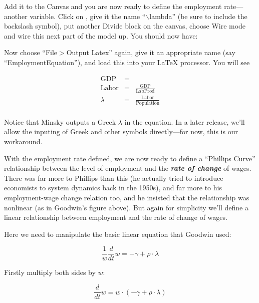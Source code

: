 \begin{center}
\end{center}

Add it to the Canvas and you are now ready to define the employment
rate---another variable. Click on , give it
the name ``$\backslash$lambda'' (be sure to include the backslash symbol), put
another Divide block on the canvas, choose Wire mode and wire this
next part of the model up. You should now have:



Now choose ``File$>$Output Latex'' again, give it an appropriate name (say ``EmploymentEquation''), and load this into your LaTeX processor. You will see

\begin{eqnarray*}
\mathrm{GDP}&=&\\
\mathrm{Labor}&=&\frac{\mathrm{GDP}}{\mathrm{LabProd}}\\
\lambda&=&\frac{\mathrm{Labor}}{\mathrm{Population}}\\
\end{eqnarray*}

Notice that Minsky outputs a Greek $\lambda$ in the equation. In a
later release, we'll allow the inputing of Greek and other symbols
directly---for now, this is our workaround. 


With the employment rate defined, we are now ready to define a
``Phillips Curve'' relationship between the level of employment and the
{\em\bf rate of change} of wages. There was far more to Phillips than this (he
actually tried to introduce economists to system dynamics back in the
1950s), and far more to his employment-wage change relation too, and
he insisted that the relationship was nonlinear (as in Goodwin's
figure above). But again for simplicity we'll define a linear
relationship between employment and the rate of change of wages. 

Here we need to manipulate the basic linear equation that Goodwin used:

\begin{displaymath}
\frac1w\frac d{dt}w = -\gamma+\rho\cdot\lambda
\end{displaymath}

Firstly multiply both sides by $w$:

\begin{displaymath}
\frac d{dt}w = w\cdot(-\gamma+\rho\cdot\lambda)
\end{displaymath}

